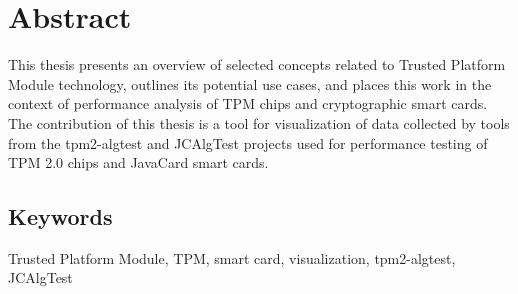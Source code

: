 \chapter*{Abstract}
\noindent
This thesis presents an overview of selected concepts related to Trusted Platform Module technology, outlines its potential use cases, and places this work in the context of performance analysis of TPM chips and cryptographic smart cards. The contribution of this thesis is a tool for visualization of data collected by tools from the tpm2-algtest and JCAlgTest projects used for performance testing of TPM 2.0 chips and JavaCard smart cards.

\section*{Keywords}
\noindent
Trusted Platform Module, TPM, smart card, visualization, tpm2-algtest, JCAlgTest
